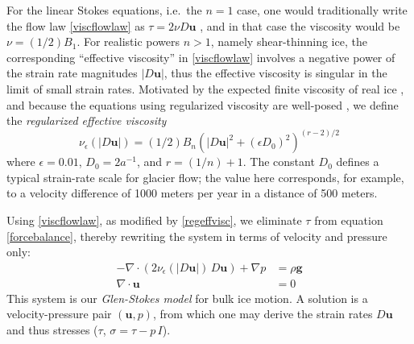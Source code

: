 \documentclass[letterpaper,final,12pt,reqno]{amsart}
\newcommand{\eps}{\epsilon}
\newcommand{\Div}{\nabla\cdot}
\newcommand{\bu}{\mathbf{u}}
\begin{document}
For the linear Stokes equations, i.e.~the $n=1$ case, one would traditionally write the flow law \eqref{viscflowlaw} as $\tau = 2\nu D\bu$ \cite{Elmanetal2014}, and in that case the viscosity would be $\nu = (1/2) B_1$.  For realistic powers $n>1$, namely shear-thinning ice, the corresponding ``effective viscosity'' in \eqref{viscflowlaw} involves a negative power of the strain rate magnitudes $|D\bu|$, thus the effective viscosity is singular in the limit of small strain rates.  Motivated by the expected finite viscosity of real ice \cite{GreveBlatter2009}, and because the equations using regularized viscosity are well-posed \cite{JouvetRappaz2011}, we define the \emph{regularized effective viscosity}
\begin{equation}
\nu_\eps(|D\bu|) = (1/2) B_n \left(|D\bu|^2 + (\eps D_0)^2\right)^{(r-2)/2} \label{regeffvisc}
\end{equation}
where $\eps = 0.01$, $D_0 = 2 a^{-1}$, and $r=(1/n)+1$.  The constant $D_0$ defines a typical strain-rate scale for glacier flow; the value here corresponds, for example, to a velocity difference of 1000 meters per year in a distance of 500 meters.

Using \eqref{viscflowlaw}, as modified by \eqref{regeffvisc}, we eliminate $\tau$ from equation \eqref{forcebalance}, thereby rewriting the system in terms of velocity and pressure only:
\begin{align}
- \nabla \cdot \left(2 \nu_\eps(|D\bu|)\, D\bu\right) + \nabla p &= \rho \mathbf{g} \label{stokes} \\
\Div \bu &= 0 \label{incompagain}
\end{align}
This system is our \emph{Glen-Stokes model} for bulk ice motion.  A solution is a velocity-pressure pair $(\bu,p)$, from which one may derive the strain rates $D\bu$ and thus stresses ($\tau$, $\sigma = \tau - p\,I$).
\end{document}
